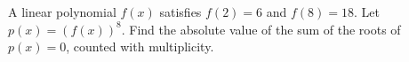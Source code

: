 A linear polynomial $f(x)$ satisfies $f(2)=6$ and $f(8)=18$. Let $p(x)=\left(f(x)\right)^8$. Find the absolute value of the sum of the roots of $p(x)=0$, counted with multiplicity.
